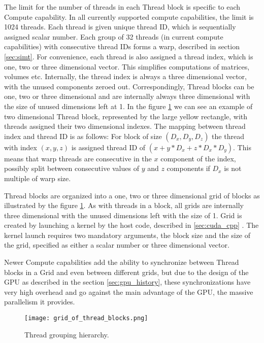 The limit for the number of threads in each Thread block is specific to each Compute capability. In all currently supported compute capabilities, the limit is 1024 threads. %
Each thread is given unique thread ID, which is sequentially assigned scalar number. Each group of 32 threads (in current compute capabilities) with consecutive thread IDs forms a warp, described in section \ref{sec:simt}. For convenience, each thread is also assigned a thread index, which is one, two or three dimensional vector. This simplifies computations of matrices, volumes etc. Internally, the thread index is always a three dimensional vector, with the unused components zeroed out. Correspondingly, Thread blocks can be one, two or three dimensional and are internally always three dimensional with the size of unused dimensions left at 1. In the figure \ref{fig:thread_hierarchy} we can see an example of two dimensional Thread block, represented by the large yellow rectangle, with threads assigned their two dimensional indexes. The mapping between thread index and thread ID is as follows: For block of size $(D_x, D_y, D_z)$ the thread with index $(x,y,z)$ is assigned thread ID of $(x + y*D_x + z*D_x*D_y)$. This means that warp threads are consecutive in the $x$ component of the index, possibly split between consecutive values of $y$ and $z$ components if $D_x$ is not multiple of warp size.

Thread blocks are organized into a one, two or three dimensional grid of blocks as illustrated by the figure \ref{fig:thread_hierarchy}. As with threads in a block, all grids are internally three dimensional with the unused dimensions left with the size of 1. Grid is created by launching a kernel by the host code, described in \ref{sec:cuda_cpp} . The kernel launch requires two mandatory arguments, the block size and the size of the grid, specified as either a scalar number or three dimensional vector.

Newer Compute capabilities add the ability to synchronize between Thread blocks in a Grid and even between different grids, but due to the design of the GPU as described in the section \ref{sec:gpu_history}, these synchronizations have very high overhead %
and go against the main advantage of the GPU, the massive parallelism it provides.




\begin{figure}[h]
	\centering
	\texttt{[image: grid\_of\_thread\_blocks.png]}
	\caption{Thread grouping hierarchy.}
	\label{fig:thread_hierarchy}
\end{figure}


